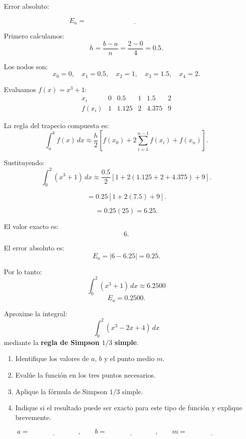 \documentclass[11pt,respuestas,a4]{aleph-examen}
\begin{document}
\begin{preguntas}
Error absoluto:

\[
E_a=\underline{\hspace{6cm}}
\]

\begin{respuesta}
Primero calculamos:
\[
h=\frac{b-a}{n}=\frac{2-0}{4}=0.5.
\]

Los nodos son:
\[
x_0=0,
\quad
x_1=0.5,
\quad
x_2=1,
\quad
x_3=1.5,
\quad
x_4=2.
\]

Evaluamos $f(x)=x^3+1$:
\[
\begin{array}{c|ccccc}
x_i & 0 & 0.5 & 1 & 1.5 & 2 \\
\hline
f(x_i) & 1 & 1.125 & 2 & 4.375 & 9
\end{array}
\]

La regla del trapecio compuesta es:
\[
\int_a^b f(x)\,dx
\approx
\frac{h}{2}
\left[
f(x_0)+2\sum_{i=1}^{n-1}f(x_i)+f(x_n)
\right].
\]

Sustituyendo:
\[
\int_0^2 (x^3+1)\,dx
\approx
\frac{0.5}{2}
\left[
1+2(1.125+2+4.375)+9
\right].
\]

\[
=
0.25
\left[
1+2(7.5)+9
\right].
\]

\[
=
0.25(25)=6.25.
\]

El valor exacto es:
\[
6.
\]

El error absoluto es:
\[
E_a=|6-6.25|=0.25.
\]

Por lo tanto:
\[
\boxed{\int_0^2 (x^3+1)\,dx\approx 6.2500}
\]
\[
\boxed{E_a=0.2500}.
\]
\end{respuesta}


\item
Aproxime la integral: 
\[
\int_0^2 (x^3-2x+4)\,dx
\]
mediante la \textbf{regla de Simpson $1/3$ simple}.

\begin{enumerate}[label=\alph*)]
    \item Identifique los valores de $a$, $b$ y el punto medio $m$.
    \item Evalúe la función en los tres puntos necesarios.
    \item Aplique la fórmula de Simpson $1/3$ simple.
    \item Indique si el resultado puede ser exacto para este tipo de función y explique brevemente.
\end{enumerate}

\[
a=\underline{\hspace{3cm}},
\qquad
b=\underline{\hspace{3cm}},
\qquad
m=\underline{\hspace{3cm}}
\]


\end{preguntas}
\end{document}
